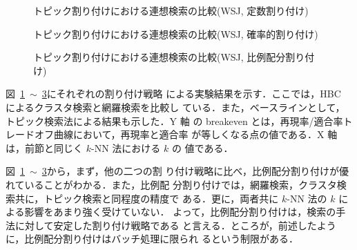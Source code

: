 \begin{figure}
 \begin{center}
  
  
 \end{center}
 \vspace{-1.5mm}
 \caption{トピック割り付けにおける連想検索の比較(WSJ, 定数割り付け)}
 \label{fig:wsj-kdoc}
 \vspace{-1.5mm}
\end{figure}

\begin{figure}
 \begin{center}
  
  
 \end{center}
 \vspace{-1.5mm}
 \caption{トピック割り付けにおける連想検索の比較(WSJ, 確率的割り付け)}
 \label{fig:wsj-thresh}
 \vspace{-1.5mm}
\end{figure}

\begin{figure}
 \begin{center}
  
  
 \end{center}
 \vspace{-1.5mm}
 \caption{トピック割り付けにおける連想検索の比較(WSJ, 比例配分割り付け)}
 \label{fig:wsj-prop}
 \vspace{-1.5mm}
\end{figure}

図~\ref{fig:wsj-kdoc}~$\sim$~\ref{fig:wsj-prop}にそれぞれの割り付け戦略
による実験結果を示す．ここでは，HBC によるクラスタ検索と網羅検索を比較し
ている．また，ベースラインとして，トピック検索法による結果も示した．Y 軸
の breakeven とは，再現率/適合率トレードオフ曲線において，再現率と適合率
が等しくなる点の値である．X 軸は，前節と同じく $k$-NN 法における $k$ の
値である．

図~\ref{fig:wsj-kdoc}~$\sim$~\ref{fig:wsj-prop}から，まず，他の二つの割
り付け戦略に比べ，比例配分割り付けが優れていることがわかる．また，比例配
分割り付けでは，網羅検索，クラスタ検索共に，トピック検索と同程度の精度で
ある．更に，両者共に $k$-NN 法の $k$ による影響をあまり強く受けていない．
よって，比例配分割り付けは，検索の手法に対して安定した割り付け戦略である
と言える．ところが，前述したように，比例配分割り付けはバッチ処理に限られ
るという制限がある．

